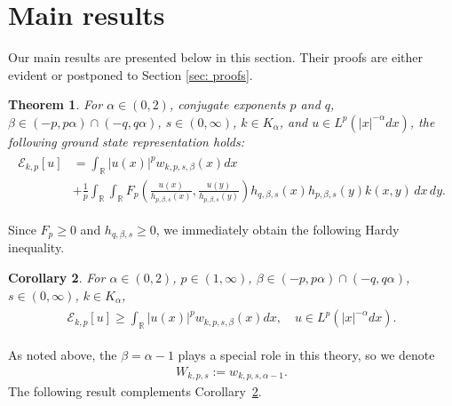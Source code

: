 \documentclass[12pt, a4paper]{amsart}
\newtheorem{theorem}{Theorem}[section]
\newtheorem{corollary}[theorem]{Corollary}
\newcommand*{\cyan}{\textcolor{cyan}}
\newcommand{\R}{\mathbb{R}}
\newcommand{\E}{\mathcal{E}}
\begin{document}
\section{Main results}
\label{section : main results}
Our main results
are presented below in this section. Their proofs are either evident or postponed to Section \cref{sec: proofs}.
\begin{theorem}
\label{theorem: Hardy Identity}
For $\alpha \in (0, 2)$, conjugate exponents $p$ and $q$, $\beta \in (-p, p\alpha) \cap \left(-q, q\alpha \right)$, $s \in (0, \infty)$, $k \in K_\alpha$, and $u \in L^p(|x|^{-\alpha}dx)$, the following ground state representation holds:
\begin{align}
\label{equation: ground state representation}
\begin{split}
        \E_{k, p}[u] &= \int_{\R}|u(x)|^pw_{k, p, s, \beta}(x)dx
    \\
    &+  \frac{1}{p}\int_{\R}\int_{\R}F_p \left( \frac{u(x)}{h_{p, \beta, s}(x)}, \frac{u(y)}{h_{p, \beta, s}(y)}\right) h_{q, \beta, s}(x)h_{p, \beta, s}(y) k(x, y)\,dx\,dy.
\end{split}
\end{align}
\end{theorem}
Since $F_p\ge 0$ and $h_{q,\beta,s}\ge 0$, we immediately obtain the following Hardy inequality. 
\begin{corollary}\label{c.Hip}
 For $\alpha \in (0, 2)$, $p \in (1, \infty)$, $\beta \in (-p, p\alpha) \cap \left(-q, q\alpha \right)$, $s \in (0, \infty)$, $k \in K_\alpha$, 
\begin{align}
\label{equation: hardy inequality V}
\begin{split}
        \E_{k, p}[u] \geq \int_{\R}|u(x)|^pw_{k, p, s, \beta}(x)dx, \quad u \in L^p(|x|^{-\alpha}dx).
\end{split}
\end{align}
\end{corollary}
As noted above, the $\beta=\alpha-1$ plays a special role in this theory, so we denote
\begin{align}
    W_{k, p, s} := w_{k, p, s, \alpha -1}.
\end{align}
The following result complements Corollary~\ref{c.Hip}.
\end{document}
